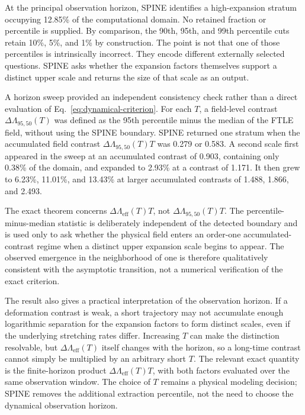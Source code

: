\documentclass[aip,cha,reprint,superscriptaddress,floatfix]{revtex4-2}
\theoremstyle{definition}
\theoremstyle{remark}
\begin{document}
At the principal observation horizon, SPINE identifies a high-expansion stratum occupying 12.85\% of the computational domain. No retained fraction or percentile is supplied. By comparison, the 90th, 95th, and 99th percentile cuts retain 10\%, 5\%, and 1\% by construction. The point is not that one of those percentiles is intrinsically incorrect. They encode different externally selected questions. SPINE asks whether the expansion factors themselves support a distinct upper scale and returns the size of that scale as an output.

A horizon sweep provided an independent consistency check rather than a direct evaluation of Eq.~\eqref{eq:dynamical-criterion}. For each \(T\), a field-level contrast \(\Delta\Lambda_{95,50}(T)\) was defined as the 95th percentile minus the median of the FTLE field, without using the SPINE boundary. SPINE returned one stratum when the accumulated field contrast \(\Delta\Lambda_{95,50}(T)T\) was 0.279 or 0.583. A second scale first appeared in the sweep at an accumulated contrast of 0.903, containing only 0.38\% of the domain, and expanded to 2.93\% at a contrast of 1.171. It then grew to 6.23\%, 11.01\%, and 13.43\% at larger accumulated contrasts of 1.488, 1.866, and 2.493.

The exact theorem concerns \(\Delta\Lambda_{\mathrm{eff}}(T)T\), not \(\Delta\Lambda_{95,50}(T)T\). The percentile-minus-median statistic is deliberately independent of the detected boundary and is used only to ask whether the physical field enters an order-one accumulated-contrast regime when a distinct upper expansion scale begins to appear. The observed emergence in the neighborhood of one is therefore qualitatively consistent with the asymptotic transition, not a numerical verification of the exact criterion.

The result also gives a practical interpretation of the observation horizon. If a deformation contrast is weak, a short trajectory may not accumulate enough logarithmic separation for the expansion factors to form distinct scales, even if the underlying stretching rates differ. Increasing \(T\) can make the distinction resolvable, but \(\Delta\Lambda_{\mathrm{eff}}(T)\) itself changes with the horizon, so a long-time contrast cannot simply be multiplied by an arbitrary short \(T\). The relevant exact quantity is the finite-horizon product \(\Delta\Lambda_{\mathrm{eff}}(T)T\), with both factors evaluated over the same observation window. The choice of \(T\) remains a physical modeling decision; SPINE removes the additional extraction percentile, not the need to choose the dynamical observation horizon.
\end{document}

